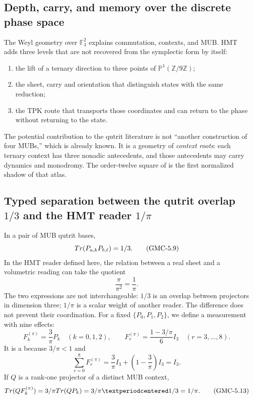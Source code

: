 \subsection{Depth, carry, and memory over the discrete phase space}

The Weyl geometry over $\mathbb F_3^2$ explains commutation, contexts, and
MUB. HMT adds three levels that are not recovered from the symplectic form by
itself:

\begin{enumerate}
 \item the lift of a ternary direction to three points of
 $\mathbb P^1(\mathbb Z/9\mathbb Z)$;
 \item the sheet, carry and orientation that distinguish states with the same reduction;
 \item the TPK route that transports those coordinates and can return to the
 phase without returning to the state.
\end{enumerate}

The potential contribution to the qutrit literature is not “another construction of
four MUBs,” which is already known. It is a geometry of \emph{context roots}: each
ternary context has three nonadic antecedents, and those antecedents
may carry dynamics and monodromy. The order-twelve square of
 is the first normalized shadow of that atlas.

\subsection{Typed separation between the qutrit overlap
\texorpdfstring{$1/3$}{1/3} and the HMT reader
\texorpdfstring{$1/\pi$}{1/pi}}

In a pair of MUB qutrit bases,
\[
 Tr(P_{a,k}P_{b,\ell})=1/3.
 \tag{GMC-5.9}
\]
In the HMT reader defined here, the relation between a real sheet and a
volumetric reading can take the quotient
\[
 \frac{\pi}{\pi^2}=\frac1\pi.
 \tag{GMC-5.10}
\]
The two expressions are not interchangeable: $1/3$ is an overlap between
projectors in dimension three; $1/\pi$ is a scalar weight of another reader.
The difference does not prevent their coordination. For a fixed \PVM
$\{P_0,P_1,P_2\}$, we define a measurement with nine effects:
\[
 F_k^{(\pi)}=\frac3\pi P_k\quad(k=0,1,2),
 \qquad
 F_r^{(\pi)}=\frac{1-3/\pi}{6}I_3\quad(r=3,\ldots,8).
 \tag{GMC-5.11}
\]
It is a \POVM because $3/\pi<1$ and
\[
 \sum_{r=0}^{8}F_r^{(\pi)}
 =\frac3\pi I_3+\left(1-\frac3\pi\right)I_3=I_3.
 \tag{GMC-5.12}
\]
If $Q$ is a rank-one projector of a distinct MUB context,
\[
 \Tr(QF_k^{(\pi)})
 =\frac3\pi\Tr(QP_k)
 =\frac3\pi\cdot\frac13
 =\frac1\pi.
 \tag{GMC-5.13}
\]

